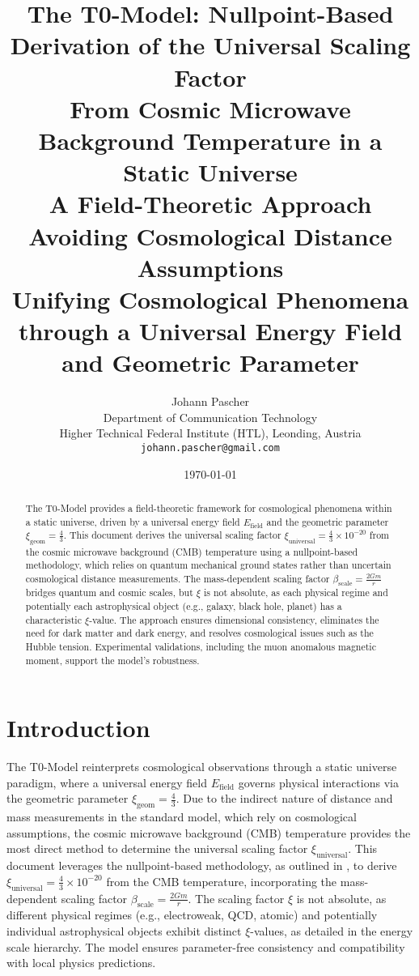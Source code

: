 \documentclass[12pt,a4paper]{report}
\title{
	{\Huge The T0-Model: Nullpoint-Based Derivation of the Universal Scaling Factor}\\
	{\LARGE From Cosmic Microwave Background Temperature in a Static Universe}\\
	{\Large A Field-Theoretic Approach Avoiding Cosmological Distance Assumptions}\\
	\vspace{1cm}
	{\large Unifying Cosmological Phenomena through a Universal Energy Field and Geometric Parameter}
}
\author{
	{\Large Johann Pascher}\\
	Department of Communication Technology\\
	Higher Technical Federal Institute (HTL), Leonding, Austria\\
	\texttt{johann.pascher@gmail.com}
}
\date{\today}
\newcommand{\Efield}{E_{\text{field}}}
\newcommand{\xipar}{\xi}
\newcommand{\xiuniversal}{\xi_{\text{universal}}}
\newcommand{\xigeom}{\xi_{\text{geom}}}
\newcommand{\betascale}{\beta_{\text{scale}}}
\theoremstyle{definition}
\begin{document}
	
	\maketitle
	
	\begin{abstract}
		The T0-Model provides a field-theoretic framework for cosmological phenomena within a static universe, driven by a universal energy field \(\Efield\) and the geometric parameter \(\xigeom = \frac{4}{3}\). This document derives the universal scaling factor \(\xiuniversal = \frac{4}{3} \times 10^{-20}\) from the cosmic microwave background (CMB) temperature using a nullpoint-based methodology, which relies on quantum mechanical ground states rather than uncertain cosmological distance measurements. The mass-dependent scaling factor \(\betascale = \frac{2Gm}{r}\) bridges quantum and cosmic scales, but \(\xipar\) is not absolute, as each physical regime and potentially each astrophysical object (e.g., galaxy, black hole, planet) has a characteristic \(\xipar\)-value. The approach ensures dimensional consistency, eliminates the need for dark matter and dark energy, and resolves cosmological issues such as the Hubble tension. Experimental validations, including the muon anomalous magnetic moment, support the model's robustness.
	\end{abstract}
	
	\tableofcontents
	
	\chapter{Introduction}
	\label{chap:introduction}
	
	The T0-Model reinterprets cosmological observations through a static universe paradigm, where a universal energy field \(\Efield\) governs physical interactions via the geometric parameter \(\xigeom = \frac{4}{3}\). Due to the indirect nature of distance and mass measurements in the standard model, which rely on cosmological assumptions, the cosmic microwave background (CMB) temperature provides the most direct method to determine the universal scaling factor \(\xiuniversal\). This document leverages the nullpoint-based methodology, as outlined in \cite{pascher_derivation_beta_2025}, to derive \(\xiuniversal = \frac{4}{3} \times 10^{-20}\) from the CMB temperature, incorporating the mass-dependent scaling factor \(\betascale = \frac{2Gm}{r}\). The scaling factor \(\xipar\) is not absolute, as different physical regimes (e.g., electroweak, QCD, atomic) and potentially individual astrophysical objects exhibit distinct \(\xipar\)-values, as detailed in the energy scale hierarchy. The model ensures parameter-free consistency and compatibility with local physics predictions.
	
\end{document}

